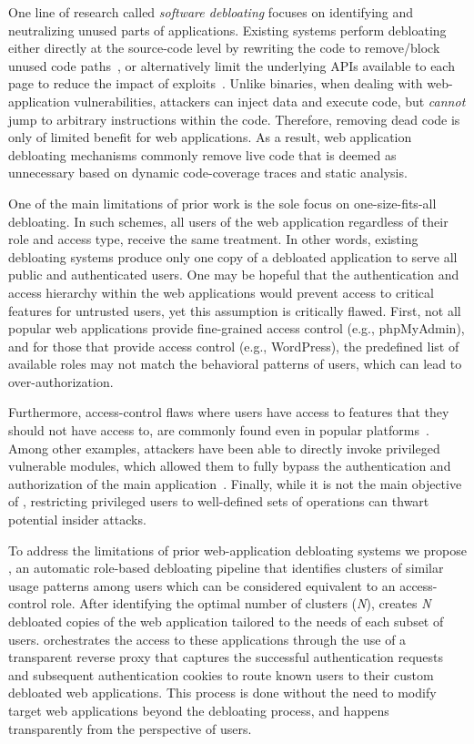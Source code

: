 One line of research called \emph{software debloating} focuses on identifying and neutralizing unused parts of applications. 
Existing systems perform debloating either directly at the source-code level by rewriting the code to remove/block unused code paths~\cite{lessismore, mininode}, or alternatively 
limit the underlying APIs available to each page to reduce the impact of exploits~\cite{saphire}. 
Unlike binaries, when dealing with web-application vulnerabilities, attackers can inject data and execute code, but \emph{cannot} jump to arbitrary instructions within the code. 
Therefore, removing dead code is only of limited benefit for web applications. 
As a result, web application debloating mechanisms commonly remove live code that is deemed as unnecessary based on dynamic code-coverage traces and static analysis. 

One of the main limitations of prior work is the sole focus on one-size-fits-all debloating. 
In such schemes, all users of the web application regardless of their role and access type, receive the same treatment. 
In other words, existing debloating systems produce only one copy of a debloated application to serve all public and authenticated users. 
One may be hopeful that the authentication and access hierarchy within the web applications would prevent access to critical features for untrusted users, yet
this assumption is critically flawed. 
First, not all popular web applications provide fine-grained access control (e.g., phpMyAdmin), and for those that provide access control (e.g., WordPress), the predefined list of available roles may not match the behavioral patterns of users, which can lead to over-authorization. 

Furthermore, access-control flaws where users have access to features that they should not have access to, are commonly found even in popular platforms~\cite{dalton2009nemesis,doupe2011fear}. 
Among other examples, attackers have been able to directly invoke privileged vulnerable modules, which allowed them to fully bypass the authentication and authorization of the main application~\cite{wpfilemanager}. 
Finally, while it is not the main objective of \sys{}, restricting privileged users to well-defined sets of operations can thwart potential insider attacks.

To address the limitations of prior web-application debloating systems
we propose \sys{}, an automatic role-based debloating pipeline that identifies clusters of similar usage patterns among users which can be considered equivalent to an access-control role. 
After identifying the optimal number of clusters (\emph{N}), \sys{} creates \emph{N} debloated copies of the web application tailored to the needs of each subset of users. \sys{} orchestrates the access to these applications through the use of a transparent reverse proxy that captures the successful authentication requests and subsequent authentication cookies to route known users to their custom debloated web applications. 
This process is done without the need to modify target web applications beyond the debloating process, and happens transparently from the perspective of users.


